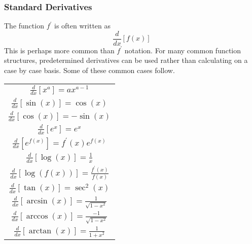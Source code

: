 \documentclass[12pt]{report}
\begin{document}
\begin{flushleft}
\subsubsection*{Standard Derivatives}
The function \(f^\prime\) is often written as 
\[\frac{d}{dx}[f(x)]\]
This is perhaps more common than \(f^\prime\) notation. For many common 
function structures, predetermined derivatives can be used rather than 
calculating on a case by case basis. Some of these common cases follow.
\begin{center}
    \begin{tabular}{||c||}
        \(\frac{d}{dx}[x^a] = ax^{a-1}\) \\[7pt]
        \(\frac{d}{dx}[\sin(x)] = \cos(x)\) \\[7pt]
        \(\frac{d}{dx}[\cos(x)] = -\sin(x)\) \\[7pt]
        \(\frac{d}{dx}[e^x] = e^x\) \\[7pt]
        \(\frac{d}{dx}[e^{f(x)}] = f^\prime(x)e^{f(x)}\) \\[7pt]
        \(\frac{d}{dx}[\log(x)] = \frac{1}{x}\) \\[7pt]
        \(\frac{d}{dx}[\log(f(x))] = \frac{f^\prime(x)}{f(x)}\) \\[7pt]
        \(\frac{d}{dx}[\tan(x)] = \sec^2(x)\) \\[7pt]
        \(\frac{d}{dx}[\arcsin(x)] = \frac{1}{\sqrt{1 - x^2}}\) \\[7pt]
        \(\frac{d}{dx}[\arccos(x)] = \frac{-1}{\sqrt{1-x^2}}\) \\[7pt]
        \(\frac{d}{dx}[\arctan(x)] = \frac{1}{1 + x^2}\) \\[7pt]
    \end{tabular}
\end{center}


\end{flushleft}
\end{document}
